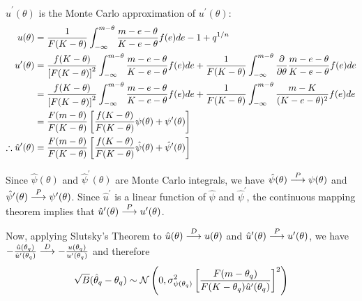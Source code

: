 $\hat{u}^\prime(\theta)$ is the Monte Carlo approximation of $u^\prime(\theta)$:\begin{align*}
    u(\theta) &= \frac{1}{F(K-\theta)} \int^{m-\theta}_{-\infty} \frac{m-e-\theta}{K-e-\theta} f(e) de - 1 + q^{1/n} \\
    u^\prime(\theta)
        &= \frac{f(K-\theta)}{\left[F(K-\theta)\right]^2} \int^{m-\theta}_{-\infty} \frac{m-e-\theta}{K-e-\theta} f(e) de + \frac{1}{F(K-\theta)} \int^{m-\theta}_{-\infty} \frac{\partial}{\partial \theta} \frac{m-e-\theta}{K-e-\theta} f(e) de \\
        &= \frac{f(K-\theta)}{\left[F(K-\theta)\right]^2} \int^{m-\theta}_{-\infty} \frac{m-e-\theta}{K-e-\theta} f(e) de + \frac{1}{F(K-\theta)} \int^{m-\theta}_{-\infty} \frac{m-K}{(K-e-\theta)^2} f(e) de \\
        &= \frac{F(m-\theta)}{F(K-\theta)} \left[ \frac{f(K-\theta)}{F(K-\theta)} \psi(\theta) +\psi^\prime(\theta) \right] \\
    \therefore \hat{u}^\prime(\theta) &= \frac{F(m-\theta)}{F(K-\theta)} \left[ \frac{f(K-\theta)}{F(K-\theta)} \hat\psi(\theta) +\hat\psi^\prime(\theta) \right]
\end{align*}

Since $\hat\psi(\theta)$ and $\hat\psi^\prime(\theta)$ are Monte Carlo integrals, we have $\hat\psi(\theta) \overset{P}{\longrightarrow} \psi(\theta)$ and $\hat\psi^\prime(\theta) \overset{P}{\longrightarrow} \psi^\prime(\theta)$. Since $\hat{u}^\prime$ is a linear function of $\hat\psi$ and $\hat\psi^\prime$, the continuous mapping theorem implies that $\hat{u}^\prime(\theta) \overset{P}{\longrightarrow} u^\prime(\theta)$.

Now, applying Slutsky's Theorem to $\hat{u}(\theta) \overset{D}{\longrightarrow} u(\theta)$ and $\hat{u}^\prime(\theta) \overset{P}{\longrightarrow} u^\prime(\theta)$, we have $-\frac{\hat{u}(\theta_q)}{\hat{u}^\prime(\theta_q)} \overset{D}{\longrightarrow} -\frac{{u}(\theta_q)}{{u}^\prime(\theta_q)}$ and therefore \begin{equation}
    \sqrt{B}(\hat\theta_q - \theta_q) \sim \mathcal{N} \left(0, \sigma^2_{\psi(\theta_q)} \left[ \frac{F(m-\theta_q)}{F(K-\theta_q)\hat{u}^\prime(\theta_q)} \right]^2 \right)
\end{equation}
